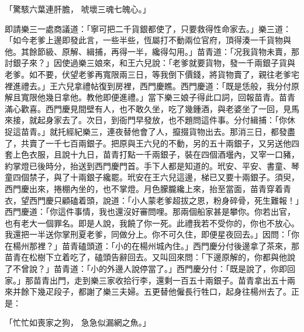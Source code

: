 \begin{showcontents}{}
「驚駭六葉連肝膽，  唬壞三魂七魄心。」

即請樂三一處商議道：「寧可把二千貨銀都使了，只要救得性命家去。」樂三道：「如今老爹上邊即發此言，一些半些，恆屬打不動兩位官府，頂得湊一千貨物與他。其餘節級、原解、緝捕，再得一半，纔得勾用。」苗青道：「况我貨物未賣，那討銀子來？」因使過樂三娘來，和王六兒說：「老爹就要貨物，發一千兩銀子貨與老爹。如不要，伏望老爹再寬限兩三日，等我倒下價錢，將貨物賣了，親往老爹宅裡進禮去。」王六兒拿禮帖復到房裡，西門慶瞧。西門慶道：「既是恁般，我分付原解且寬限他幾日拿他。教他即便進禮。」當下樂三娘子得此口詞，回報苗青。苗青滿心歡喜。西門慶見間壁有人，也不敢久坐，吃了幾鍾酒，與老婆坐了一回，見馬來接，就起身家去了。次日，到衙門早發放，也不題問這件事。分付緝捕：「你休捉這苗青。」就托經紀樂三，連夜替他會了人，攛掇貨物出去。那消三日，都發盡了，共賣了一千七百兩銀子。把原與王六兒的不動，另的五十兩銀子，又另送他四套上色衣服，且說十九日，苗青打點一千兩銀子，裝在四個酒壜內，又宰一口豬，約掌燈已後時分，抬送到西門慶門首。手下人都是知道的。玳安、平安、書童、琴童四個禁子，與了十兩銀子纔罷。玳安在王六兒這邊，梯已又要十兩銀子。須臾，西門慶出來，捲棚內坐的，也不掌燈。月色朦朧纔上來，抬至當面，苗青穿着青衣，望西門慶只顧磕着頭，說道：「小人蒙老爹超拔之恩，粉身碎骨，死生難報！」西門慶道：「你這件事情，我也還沒好審問哩。那兩個船家甚是攀你。你若出官，也有老大一個罪名。即是人說，我饒了你一死。此禮我若不受你的，你也不放心。我還把一半送你掌刑夏老爹，同做分上。你不可久住，即便星夜回去。」因問：「你在楊州那裡？」苗青磕頭道：「小的在楊州城內住。」西門慶分付後邊拿了茶來，那苗青在松樹下立着吃了，磕頭告辭回去。又叫回來問：「下邊原解的，你都與他說了不曾說？」苗青道：「小的外邊人說停當了。」西門慶分付：「既是說了，你即回家。」那苗青出門，走到樂三家收拾行李，還剩一百五十兩銀子。苗青拿出五十兩來并餘下幾疋段子，都謝了樂三夫婦。五更替他僱長行牲口，起身往楊州去了。正是：

「忙忙如喪家之狗，  急急似漏網之魚。」


\end{showcontents}
